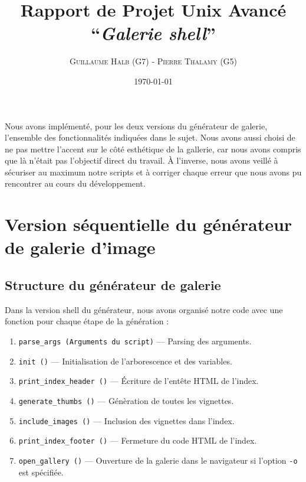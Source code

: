 \documentclass[10.9pt]{article}
\title{Rapport de Projet Unix Avancé\\
  ``{\em Galerie shell}'' }
\author{\textsc{Guillaume Halb (G7)} - \textsc{Pierre Thalamy (G5)}}
\date{\today}
\begin{document}
\maketitle

Nous avons implémenté, pour les deux versions du générateur
de galerie, l'ensemble des fonctionnalités indiquées dans le
sujet. Nous avons aussi choisi de ne pas mettre l'accent sur le côté esthétique
de la gallerie, car
nous avons compris que là n'était pas l'objectif direct du travail. À
l'inverse, nous avons veillé à sécuriser au maximum notre scripts et
à corriger chaque erreur que nous avons pu rencontrer au cours du
développement. \\

\section{Version séquentielle du générateur de galerie d'image}

\subsection{Structure du générateur de galerie}

Dans la version shell du générateur, nous avons organisé notre code
avec une fonction pour chaque étape de la génération :
\begin{enumerate}
  \item \lstinline!parse_args (Arguments du script)! 
    –– Parsing des arguments.
  \item \lstinline!init ()! –– Initialisation de l'arborescence
    et des variables.
  \item \lstinline!print_index_header ()! –– Écriture de l'entête HTML de
    l'index.
  \item \lstinline!generate_thumbs ()! –– Génèration de toutes les vignettes.
  \item \lstinline!include_images ()! –– Inclusion des vignettes dans
    l'index.
  \item \lstinline!print_index_footer ()! –– Fermeture du code HTML de
    l'index.
  \item \lstinline!open_gallery ()! –– Ouverture de la galerie dans le
    navigateur si l'option \lstinline!-o! est spécifiée.
\end{enumerate}
\end{document}
